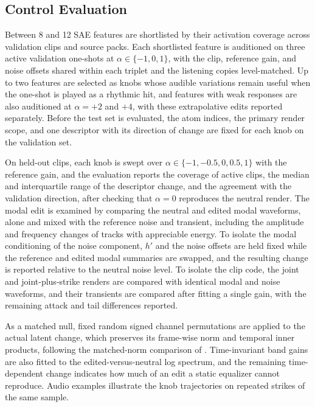 \subsection{Control Evaluation}
\label{sec:exp-control}
Between 8 and 12 SAE features are shortlisted by their activation coverage across validation clips and source packs.
Each shortlisted feature is auditioned on three active validation one-shots at $\alpha\in\{-1,0,1\}$, with the clip, reference gain, and noise offsets shared within each triplet and the listening copies level-matched.
Up to two features are selected as knobs whose audible variations remain useful when the one-shot is played as a rhythmic hit, and features with weak responses are also auditioned at $\alpha=+2$ and $+4$, with these extrapolative edits reported separately.
Before the test set is evaluated, the atom indices, the primary render scope, and one descriptor with its direction of change are fixed for each knob on the validation set.

On held-out clips, each knob is swept over $\alpha\in\{-1,-0.5,0,0.5,1\}$ with the reference gain, and the evaluation reports the coverage of active clips, the median and interquartile range of the descriptor change, and the agreement with the validation direction, after checking that $\alpha=0$ reproduces the neutral render.
The modal edit is examined by comparing the neutral and edited modal waveforms, alone and mixed with the reference noise and transient, including the amplitude and frequency changes of tracks with appreciable energy.
To isolate the modal conditioning of the noise component, $h'$ and the noise offsets are held fixed while the reference and edited modal summaries are swapped, and the resulting change is reported relative to the neutral noise level.
To isolate the clip code, the joint and joint-plus-strike renders are compared with identical modal and noise waveforms, and their transients are compared after fitting a single gain, with the remaining attack and tail differences reported.

As a matched null, fixed random signed channel permutations are applied to the actual latent change, which preserves its frame-wise norm and temporal inner products, following the matched-norm comparison of \citet{singh2026discovering}.
Time-invariant band gains are also fitted to the edited-versus-neutral log spectrum, and the remaining time-dependent change indicates how much of an edit a static equalizer cannot reproduce.
Audio examples illustrate the knob trajectories on repeated strikes of the same sample.
